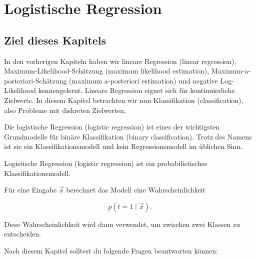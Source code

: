 \chapter{Logistische Regression}

\section{Ziel dieses Kapitels}

In den vorherigen Kapiteln haben wir lineare Regression (linear regression), Maximum-Likelihood-Schätzung (maximum likelihood estimation), Maximum-a-posteriori-Schätzung (maximum a-posteriori estimation) und negative Log-Likelihood kennengelernt.
Lineare Regression eignet sich für kontinuierliche Zielwerte.
In diesem Kapitel betrachten wir nun Klassifikation (classification), also Probleme mit diskreten Zielwerten.

Die logistische Regression (logistic regression) ist eines der wichtigsten Grundmodelle für binäre Klassifikation (binary classification).
Trotz des Namens ist sie ein Klassifikationsmodell und kein Regressionsmodell im üblichen Sinn.

\begin{conceptbox}
Logistische Regression (logistic regression) ist ein probabilistisches Klassifikationsmodell.

Für eine Eingabe \(\vec{x}\) berechnet das Modell eine Wahrscheinlichkeit

\[
    p(t=1 \mid \vec{x}).
\]

Diese Wahrscheinlichkeit wird dann verwendet, um zwischen zwei Klassen zu entscheiden.
\end{conceptbox}

Nach diesem Kapitel solltest du folgende Fragen beantworten können:

